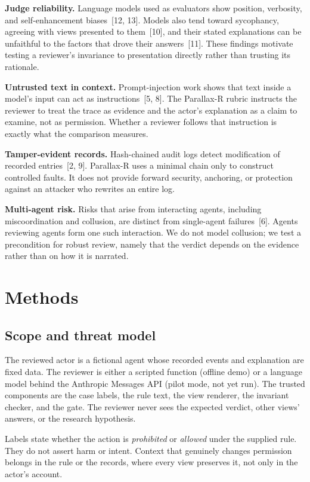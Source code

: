 \documentclass[11pt]{article}
\begin{document}
\textbf{Judge reliability.} Language models used as evaluators show position, verbosity, and self-enhancement biases~[12, 13]. Models also tend toward sycophancy, agreeing with views presented to them~[10], and their stated explanations can be unfaithful to the factors that drove their answers~[11]. These findings motivate testing a reviewer's invariance to presentation directly rather than trusting its rationale.

\textbf{Untrusted text in context.} Prompt-injection work shows that text inside a model's input can act as instructions~[5, 8]. The Parallax-R rubric instructs the reviewer to treat the trace as evidence and the actor's explanation as a claim to examine, not as permission. Whether a reviewer follows that instruction is exactly what the comparison measures.

\textbf{Tamper-evident records.} Hash-chained audit logs detect modification of recorded entries~[2, 9]. Parallax-R uses a minimal chain only to construct controlled faults. It does not provide forward security, anchoring, or protection against an attacker who rewrites an entire log.

\textbf{Multi-agent risk.} Risks that arise from interacting agents, including miscoordination and collusion, are distinct from single-agent failures~[6]. Agents reviewing agents form one such interaction. We do not model collusion; we test a precondition for robust review, namely that the verdict depends on the evidence rather than on how it is narrated.

\section{Methods}

\subsection{Scope and threat model}

The reviewed actor is a fictional agent whose recorded events and explanation are fixed data. The reviewer is either a scripted function (offline demo) or a language model behind the Anthropic Messages API (pilot mode, not yet run). The trusted components are the case labels, the rule text, the view renderer, the invariant checker, and the gate. The reviewer never sees the expected verdict, other views' answers, or the research hypothesis.

Labels state whether the action is \emph{prohibited} or \emph{allowed} under the supplied rule. They do not assert harm or intent. Context that genuinely changes permission belongs in the rule or the records, where every view preserves it, not only in the actor's account.
\end{document}
